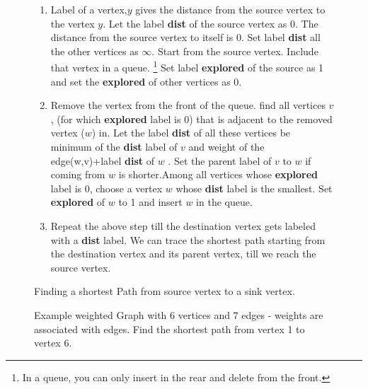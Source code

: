 \begin{figure} 
\begin{enumerate}
\item  Label of a vertex,$y$ gives the distance from the source vertex to the vertex $y$.  Let the label \textbf{dist} of the source vertex as 0. The distance from the source vertex to itself is 0. Set label \textbf{dist} all the other vertices as $\infty$. Start from the source vertex. Include that vertex in a queue. \footnote{ In a queue, you can only insert in the rear and delete from the front.} Set label \textbf{explored} of the source as 1 and set the \textbf{explored} of other vertices as 0.
\item Remove the vertex from the front of the queue. find all vertices $v$, (for which \textbf{explored} label is 0) that is adjacent to the removed vertex ($w$) in. Let the label \textbf{dist} of all these vertices be minimum of the \textbf{dist} label of $v$ and weight of the edge(w,v)+label \textbf{dist} of $w$ .  Set the parent label of $v$ to $w$ if coming from $w$ is shorter.Among all vertices whose \textbf{explored} label is 0, choose a vertex $w$ whose \textbf{dist} label is the smallest. Set \textbf{explored} of $w$ to 1 and insert $w$ in the queue.
\item Repeat the above step till the destination vertex gets labeled with a \textbf{dist} label. We can trace the shortest path starting from the destination vertex and its parent vertex, till we reach the source vertex.
\end{enumerate}
\caption{Finding a shortest Path from source vertex to a sink vertex.}\label{12a2}
\end{figure}

\begin{figure}
\begin{center}
\caption{ Example weighted Graph with 6 vertices and 7 edges - weights are associated with edges. Find the shortest path from vertex 1 to vertex 6.}\label{12g8}
\end{center}
\end{figure}

